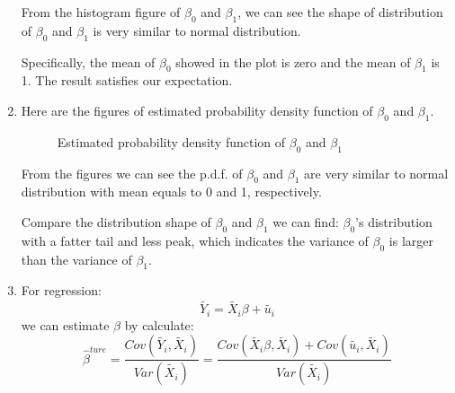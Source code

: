 \documentclass[12pt,letterpaper]{article}
\begin{document}
\begin{enumerate}[label=\textbf{(\Alph*)}]
From the histogram figure of $\beta_0$ and $\beta_1$, we can see the shape of distribution of $\beta_0$ and $\beta_1$ is very similar to normal distribution. 

Specifically, the mean of $\beta_0$ showed in the plot is zero and the mean of $\beta_1$ is 1. The result satisfies our expectation.               

\item
Here are the figures of estimated probability density function of $\beta_0$ and $\beta_1$.
\begin{figure}[H]
	\centering
	\caption{ Estimated probability density function of $\beta_0$ and $\beta_1$}
\end{figure}

From the figures we can see the p.d.f. of $\beta_0$ and $\beta_1$ are very similar to normal distribution with mean equals to 0 and 1, respectively.  

Compare the distribution shape of $\beta_0$ and $\beta_1$ we can find: $\beta_0$'s distribution with a fatter tail and less peak, which indicates the variance of $\beta_0$ is larger than the variance of $\beta_1$. 



\item 


For regression:
$$\tilde{Y_i}=\tilde{X_i}\beta+\tilde{u_i}$$
we can estimate $\beta$ by calculate:
$$\hat{\beta}^{ture}=\frac{Cov(\tilde{Y_i},\tilde{X_i})}{Var(\tilde{X_i})}=\frac{Cov(\tilde{X_i}\beta,\tilde{X_i})+Cov(\tilde{u_i},\tilde{X_i})}{Var(\tilde{X_i})}$$\\


\end{enumerate}
\end{document}
